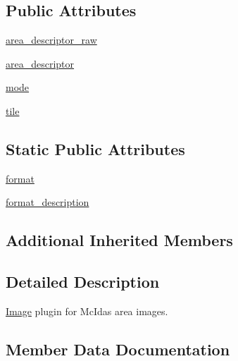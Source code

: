 \subsection*{Public Attributes}
\begin{DoxyCompactItemize}
\item 
\hyperlink{classPIL_1_1McIdasImagePlugin_1_1McIdasImageFile_a7be5aabd3fcdeed9acf2a3a72a577b5d}{area\+\_\+descriptor\+\_\+raw}
\item 
\hyperlink{classPIL_1_1McIdasImagePlugin_1_1McIdasImageFile_a393f237ade0cdd394c5c552d6e0357bf}{area\+\_\+descriptor}
\item 
\hyperlink{classPIL_1_1McIdasImagePlugin_1_1McIdasImageFile_a2c0c59b8e458e520a7ccf03b34b29e4d}{mode}
\item 
\hyperlink{classPIL_1_1McIdasImagePlugin_1_1McIdasImageFile_ac2f358f516754fa3ac76b6a36492e7fa}{tile}
\end{DoxyCompactItemize}
\subsection*{Static Public Attributes}
\begin{DoxyCompactItemize}
\item 
\hyperlink{classPIL_1_1McIdasImagePlugin_1_1McIdasImageFile_a88097c30e39b22a71e8e43cc9e159b22}{format}
\item 
\hyperlink{classPIL_1_1McIdasImagePlugin_1_1McIdasImageFile_a36b37bea8459e39524d8000a27dbed35}{format\+\_\+description}
\end{DoxyCompactItemize}
\subsection*{Additional Inherited Members}


\subsection{Detailed Description}
\hyperlink{namespacePIL_1_1Image}{Image} plugin for Mc\+Idas area images. 



\subsection{Member Data Documentation}
\mbox{\label{classPIL_1_1McIdasImagePlugin_1_1McIdasImageFile_a393f237ade0cdd394c5c552d6e0357bf}} 
